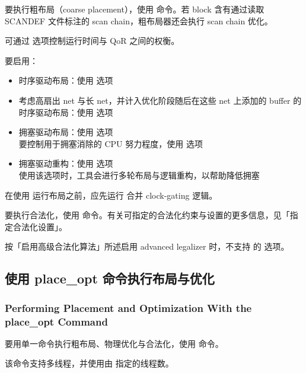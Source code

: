 要执行粗布局（coarse placement），使用  命令。若 block 含有通过读取 SCANDEF 文件标注的 scan chain，粗布局器还会执行 scan chain 优化。

可通过  选项控制运行时间与 QoR 之间的权衡。

要启用：
\begin{itemize}
  \item 时序驱动布局：使用  选项
  \item 考虑高扇出 net 与长 net，并计入优化阶段随后在这些 net 上添加的 buffer 的时序驱动布局：使用  选项
  \item 拥塞驱动布局：使用  选项\\
        要控制用于拥塞消除的 CPU 努力程度，使用  选项
  \item 拥塞驱动重构：使用  选项\\
        使用该选项时，工具会进行多轮布局与逻辑重构，以帮助降低拥塞
\end{itemize}

\begin{noteBox}
在使用  运行布局之前，应先运行  合并 clock-gating 逻辑。
\end{noteBox}

要执行合法化，使用  命令。有关可指定的合法化约束与设置的更多信息，见「指定合法化设置」。

\begin{noteBox}
按「启用高级合法化算法」所述启用 advanced legalizer 时，不支持  的  选项。
\end{noteBox}

\subsection{使用 place\_opt 命令执行布局与优化}
\subsubsection*{Performing Placement and Optimization With the place\_opt Command}

要用单一命令执行粗布局、物理优化与合法化，使用  命令。

该命令支持多线程，并使用由  指定的线程数。

